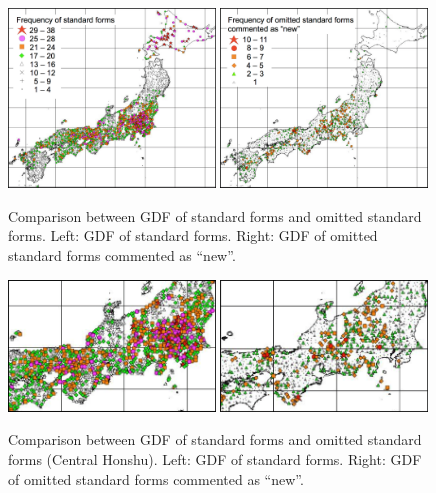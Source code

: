 \documentclass[output=paper]{LSP/langsci}
\begin{document}
\begin{figure}
\includegraphics[width=0.49\textwidth]{illustrations/kuma_fig16-a}
\includegraphics[width=0.49\textwidth]{illustrations/kuma_fig16-b}
\caption{Comparison between GDF of standard forms and omitted standard forms. Left: GDF of standard forms. Right: GDF of omitted standard forms commented as “new”.}          
\label{fig:16}
\end{figure}

\begin{figure}
\includegraphics[width=0.49\textwidth]{illustrations/kuma_fig17-a}
\includegraphics[width=0.49\textwidth]{illustrations/kuma_fig17-b}
\caption{Comparison between GDF of standard forms and omitted standard forms (Central Honshu). Left: GDF of standard forms. Right: GDF of omitted standard forms commented as “new”.}          
\label{fig:17}
\end{figure}
 
\end{document}
